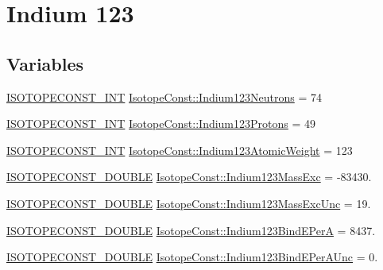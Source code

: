\hypertarget{group___isotope_const-_indium-_in123}{}\section{Indium 123}
\label{group___isotope_const-_indium-_in123}
\subsection*{Variables}
\begin{DoxyCompactItemize}
\item 
\mbox{\hyperlink{group___isotope_const-_macros_ga5f18360b3e99483a35c32d789e62621c}{I\+S\+O\+T\+O\+P\+E\+C\+O\+N\+S\+T\+\_\+\+I\+NT}} \mbox{\hyperlink{group___isotope_const-_indium-_in123_ga8b3fa6d7ee29f6bfb4ec1dc48a83e7a3}{Isotope\+Const\+::\+Indium123\+Neutrons}} = 74
\item 
\mbox{\hyperlink{group___isotope_const-_macros_ga5f18360b3e99483a35c32d789e62621c}{I\+S\+O\+T\+O\+P\+E\+C\+O\+N\+S\+T\+\_\+\+I\+NT}} \mbox{\hyperlink{group___isotope_const-_indium-_in123_gaa630e73895e055fa4cb983ff9b2c95cb}{Isotope\+Const\+::\+Indium123\+Protons}} = 49
\item 
\mbox{\hyperlink{group___isotope_const-_macros_ga5f18360b3e99483a35c32d789e62621c}{I\+S\+O\+T\+O\+P\+E\+C\+O\+N\+S\+T\+\_\+\+I\+NT}} \mbox{\hyperlink{group___isotope_const-_indium-_in123_gad3ab9532308748bd8fb5c6bc480bf04c}{Isotope\+Const\+::\+Indium123\+Atomic\+Weight}} = 123
\item 
\mbox{\hyperlink{group___isotope_const-_macros_ga8f45a7272ce02c0b4c65c44636ed719a}{I\+S\+O\+T\+O\+P\+E\+C\+O\+N\+S\+T\+\_\+\+D\+O\+U\+B\+LE}} \mbox{\hyperlink{group___isotope_const-_indium-_in123_ga36f9e892d8870ff01095fab16a6e69f5}{Isotope\+Const\+::\+Indium123\+Mass\+Exc}} = -\/83430.
\item 
\mbox{\hyperlink{group___isotope_const-_macros_ga8f45a7272ce02c0b4c65c44636ed719a}{I\+S\+O\+T\+O\+P\+E\+C\+O\+N\+S\+T\+\_\+\+D\+O\+U\+B\+LE}} \mbox{\hyperlink{group___isotope_const-_indium-_in123_ga740eea660380d57a12d1aba3dbf9c4d5}{Isotope\+Const\+::\+Indium123\+Mass\+Exc\+Unc}} = 19.
\item 
\mbox{\hyperlink{group___isotope_const-_macros_ga8f45a7272ce02c0b4c65c44636ed719a}{I\+S\+O\+T\+O\+P\+E\+C\+O\+N\+S\+T\+\_\+\+D\+O\+U\+B\+LE}} \mbox{\hyperlink{group___isotope_const-_indium-_in123_gaf51203396f65f2bddaee01022e990be2}{Isotope\+Const\+::\+Indium123\+Bind\+E\+PerA}} = 8437.
\item 
\mbox{\hyperlink{group___isotope_const-_macros_ga8f45a7272ce02c0b4c65c44636ed719a}{I\+S\+O\+T\+O\+P\+E\+C\+O\+N\+S\+T\+\_\+\+D\+O\+U\+B\+LE}} \mbox{\hyperlink{group___isotope_const-_indium-_in123_gac6acd47e3f635759106f5edabd24c27c}{Isotope\+Const\+::\+Indium123\+Bind\+E\+Per\+A\+Unc}} = 0.

\end{DoxyCompactItemize}

